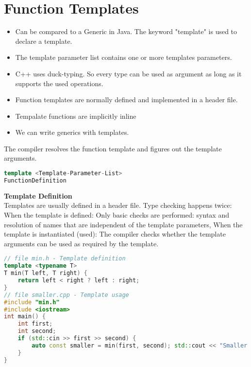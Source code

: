 
\section{Function Templates}
\begin{itemize}
  \itemsep -0.5em 
  \item Can be compared to a Generic in Java. The keyword "template" is used to declare a template.
  \item The template parameter list contains one or more templates parameters.
  \item C++ uses duck-typing. So every type can be used as argument as long as it supports the used operations.
  \item Function templates are normally defined and implemented in a header file.
  \item Tempalate functions are implicitly inline
  \item We can write generics with templates.
\end{itemize}

The compiler resolves the function template and figures out the template arguments. 
\begin{lstlisting}[language=C++]
template <Template-Parameter-List>
FunctionDefinition
\end{lstlisting}

\textbf{Template Definition}\\
Templates are usually defined in a header file. Type checking happens twice: When the template is defined: Only basic checks are performed: syntax and resolution of names that are independent of the template parameters, When the template is instantiated (used): The compiler checks whether the template arguments can be used as required by the template.
 
\begin{lstlisting}[language=C++]
// file min.h - Template definition
template <typename T>
T min(T left, T right) {
	return left < right ? left : right;
}
// file smaller.cpp - Template usage
#include "min.h"
#include <iostream>
int main() {
	int first;
	int second;
	if (std::cin >> first >> second) {
		auto const smaller = min(first, second); std::cout << "Smaller of " << first << " and " << second << " is: " << smaller << '\n';
	}
}
\end{lstlisting}

